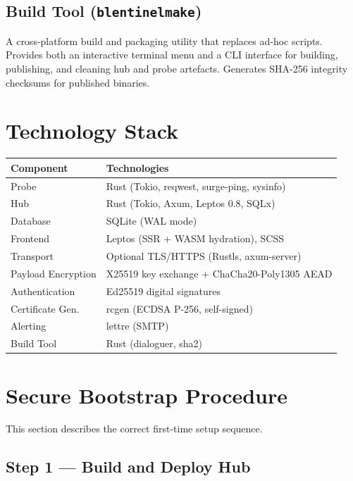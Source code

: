 \documentclass[12pt]{report}
\begin{document}
\subsection{Build Tool (\texttt{blentinelmake})}

A cross-platform build and packaging utility that replaces ad-hoc scripts.
Provides both an interactive terminal menu and a CLI interface for building,
publishing, and cleaning hub and probe artefacts. Generates SHA-256 integrity
checksums for published binaries.

\section{Technology Stack}

\begin{longtable}{@{} l l @{}}
\toprule
\textbf{Component} & \textbf{Technologies} \\
\midrule
Probe         & Rust (Tokio, reqwest, surge-ping, sysinfo) \\
Hub           & Rust (Tokio, Axum, Leptos 0.8, SQLx) \\
Database      & SQLite (WAL mode) \\
Frontend      & Leptos (SSR + WASM hydration), SCSS \\
Transport     & Optional TLS/HTTPS (Rustls, axum-server) \\
Payload Encryption & X25519 key exchange + ChaCha20-Poly1305 AEAD \\
Authentication     & Ed25519 digital signatures \\
Certificate Gen.   & rcgen (ECDSA P-256, self-signed) \\
Alerting      & lettre (SMTP) \\
Build Tool    & Rust (dialoguer, sha2) \\
\bottomrule
\end{longtable}

\section{Secure Bootstrap Procedure}

This section describes the correct first-time setup sequence.

\subsection{Step 1 --- Build and Deploy Hub}
\end{document}
